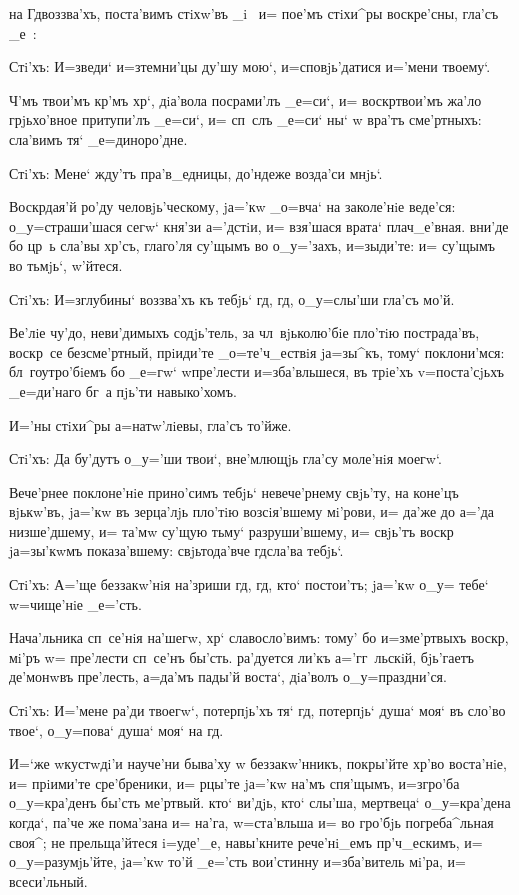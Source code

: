 
на Гд воззва'хъ, поста'вимъ стiхw'въ _i~ и= пое'мъ 
стiхи^ры воскре'сны, гла'съ _е~:

Стi'хъ: И=зведи` и=з\ъ темни'цы ду'шу мою`, 
и=сповjь'датися и='мени твоему`.

Ч'мъ твои'мъ кр'мъ хр`, дiа'вола 
посрами'лъ _е=си`, и= воскр твои'мъ жа'ло 
грjьхо'вное притупи'лъ _е=си`, и= сп~слъ _е=си` ны` w\т 
вра'тъ сме'ртныхъ: сла'вимъ тя` _е=диноро'дне. 

Стi'хъ: Мене` жду'тъ пра'в_едницы, до'ндеже возда'си 
мнjь`. 

Воскр дая'й ро'ду человjь'ческому, jа='кw _о=вча` 
на заколе'нiе веде'ся: о_у=страши'шася сегw` кня'зи 
а='дстiи, и= взя'шася врата` плач_е'вная. вни'де бо цр~ь 
сла'вы хр'съ, глаго'ля су'щымъ во о_у='захъ, 
и=зыди'те: и= су'щымъ во тьмjь`, w'йтеся.

Стi'хъ: И=з\ъ глубины` воззва'хъ къ тебjь` гд, 
гд, о_у=слы'ши гла'съ мо'й.

Ве'лiе чу'до, неви'димыхъ содjь'тель, за 
чл~вjьколю'бiе пло'тiю пострада'въ, воскр~се 
безсме'ртный, прiиди'те _о=те'ч_ествiя jа=зы^къ, тому` 
поклони'мся: бл~гоутро'бiемъ бо _е=гw` w\т пре'лести 
и=зба'вльшеся, въ трiе'хъ v=поста'сjьхъ _е=ди'наго бг~а 
пjь'ти навыко'хомъ. 

И='ны стiхи^ры а=натw'лiевы, гла'съ то'йже.

Стi'хъ: Да бу'дутъ о_у='ши твои`, вне'млющjь гла'су 
моле'нiя моегw`. 

Вече'рнее поклоне'нiе прино'симъ тебjь` невече'рнему 
свjь'ту, на коне'цъ вjькw'въ, jа='кw въ зерца'лjь пло'тiю 
возсiя'вшему мi'рови, и= да'же до а='да низше'дшему, и= 
та'мw су'щую тьму` разруши'вшему, и= свjь'тъ воскр 
jа=зы'кwмъ показа'вшему: свjьтода'вче гд сла'ва 
тебjь`.

Стi'хъ: А='ще беззакw'нiя на'зриши гд, гд, кто` 
постои'тъ; jа='кw о_у= тебе` w=чище'нiе _е='сть.

Нача'льника сп~се'нiя на'шегw, хр` славосло'вимъ: 
тому' бо и=з\ъ ме'ртвыхъ воскр, мi'ръ w= пре'лести 
сп~се'нъ бы'сть. ра'дуется ли'къ а='гг~льскiй, бjь'гаетъ 
де'монwвъ пре'лесть, а=да'мъ пады'й воста`, дiа'волъ 
о_у=праздни'ся.

Стi'хъ: И='мене ра'ди твоегw`, потерпjь'хъ тя` гд, 
потерпjь` душа` моя` въ сло'во твое`, о_у=пова` душа` 
моя` на гд.

И=`же w\т кустwдi'и науче'ни быва'ху w\т 
беззакw'нникъ, покры'йте хр'во воста'нiе, и= 
прiими'те сре'бреники, и= рцы'те jа='кw на'мъ спя'щымъ, 
и=з\ъ гро'ба о_у=кра'денъ бы'сть ме'ртвый. кто` ви'дjь, 
кто` слы'ша, мертвеца` о_у=кра'дена когда`, па'че же 
пома'зана и= на'га, w=ста'вльша и= во гро'бjь 
погреба^льная своя^; не прельща'йтеся i=уде'_е, 
навы'кните рече'нi_емъ пр'ч_ескимъ, и= 
о_у=разумjь'йте, jа='кw то'й _е='сть вои'стинну 
и=зба'витель мi'ра, и= всеси'льный.

